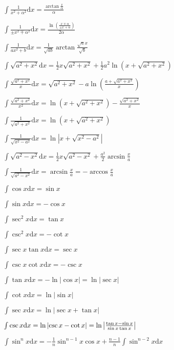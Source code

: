 \documentclass[9pt,landscape]{article}
\begin{document}
\begin{multicols}{3}
$ \int {\frac {1}{x^{2}+\alpha ^{2}}}{\mbox{d}}x={\frac {\arctan {\frac {x}{\alpha }}}{\alpha }} $

$ \int {\frac {1}{\pm x^{2}\mp \alpha ^{2}}}{\mbox{d}}x={\frac {\ln \left({\frac {x\mp \alpha }{\pm x+\alpha }}\right)}{2\alpha }} $

$ \int {\frac {1}{ax^{2}+b}}{\mbox{d}}x={\frac {1}{\sqrt {ab}}}\arctan {\frac {{\sqrt {a}}x}{\sqrt {b}}} $

$ \int {\sqrt {a^{2}+x^{2}}}{\mbox{d}}x={\frac {1}{2}}x{\sqrt {a^{2}+x^{2}}}+{\frac {1}{2}}a^{2}\ln \left(x+{\sqrt {a^{2}+x^{2}}}\right) $

$ \int {\frac {\sqrt {a^{2}+x^{2}}}{x}}{\mbox{d}}x={\sqrt {a^{2}+x^{2}}}-a\ln \left({\frac {a+{\sqrt {a^{2}+x^{2}}}}{x}}\right) $

$ \int {\frac {\sqrt {a^{2}+x^{2}}}{x^{2}}}{\mbox{d}}x=\ln \left(x+{\sqrt {a^{2}+x^{2}}}\right)-{\frac {\sqrt {a^{2}+x^{2}}}{x}} $

$ \int {\frac {1}{\sqrt {a^{2}+x^{2}}}}{\mbox{d}}x=\ln \left(x+{\sqrt {a^{2}+x^{2}}}\right) $

$ \int {\frac {1}{\sqrt {x^{2}-a^{2}}}}{\mbox{d}}x=\ln|x+{\sqrt {x^{2}-a^{2}}}| $

$ \int {\sqrt {a^{2}-x^{2}}}{\mbox{d}}x={\frac {1}{2}}x{\sqrt {a^{2}-x^{2}}}+{\frac {a^{2}}{2}}\arcsin {\frac {x}{a}} $

$ \int {\frac {1}{\sqrt {a^{2}-x^{2}}}}{\mbox{d}}x=\arcsin {\frac {x}{a}}=-\arccos {\frac {x}{a}} $

$ \int \cos x{\mbox{d}}x=\sin x $

$ \int \sin x{\mbox{d}}x=-\cos x $

$ \int \sec ^{2}x{\mbox{d}}x=\tan x $

$ \int \csc ^{2}x{\mbox{d}}x=-\cot x $

$ \int \sec x\tan x{\mbox{d}}x=\sec x $

$ \int \csc x\cot x{\mbox{d}}x=-\csc x $

$ \int \tan x{\mbox{d}}x=-\ln {\left|\cos {x}\right|}=\ln {\left|\sec x\right|} $

$ \int \cot x{\mbox{d}}x=\ln {\left|\sin x\right|} $

$ \int \sec x{\mbox{d}}x=\ln {\left|\sec x+\tan x\right|} $

$ \int \csc x{\mbox{d}}x=\ln {\left|\csc x-\cot x\right|}=\ln {\left|{\tan x-\sin x \over \sin x\tan x}\right|} $

$ \int \sin ^{n}x{\mbox{d}}x=-{\frac {1}{n}}\sin ^{n-1}x\cos x+{\frac {n-1}{n}}\int \sin ^{n-2}x{\mbox{d}}x\quad $


\end{multicols}
\end{document}
